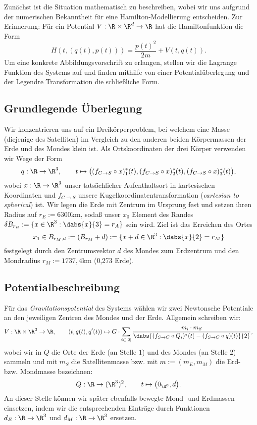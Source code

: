 \documentclass{subfiles}
\begin{document}
    

    Zunächst ist die Situation mathematisch zu beschreiben, wobei wir uns aufgrund der numerischen Bekanntheit für eine Hamilton-Modellierung entscheiden. Zur Erinnerung: Für ein Potential $V:\R\times\R^d\to\R$ hat die Hamiltonfunktion die Form 
    \[
        H(t,(q(t),p(t))) = \frac{p(t)^2}{2m} + V(t,q(t)).
    \]
    Um eine konkrete Abbildungsvorschrift zu erlangen, stellen wir die Lagrange Funktion des Systems auf und finden mithilfe von einer Potentialüberlegung und der Legendre Transformation die schließliche Form. 

    \subsection*{Grundlegende Überlegung}
        Wir konzentrieren uns auf ein Dreikörperproblem, bei welchem eine Masse (diejenige des Satelliten) im Vergleich zu den anderen beiden Körpermassen der Erde und des Mondes klein ist. Als Ortskoordinaten der drei Körper verwenden wir Wege der Form 
        \[
            q:\R\to\R^3,\qquad t\mapsto \bigl((f_{C\to S}\circ x)_1^*(t),(f_{C\to S}\circ x)_2^*(t),(f_{C\to S}\circ x)_3^*(t)\bigr),
        \]
        wobei $x:\R\to\R^3$ unser tatsächlicher Aufenthaltsort in kartesischen Koordinaten und $f_{C\to S}$ unsere Kugelkoordinatentransformation (\emph{cartesian to spherical}) ist. Wir legen die Erde mit Zentrum im Ursprung fest und setzen ihren Radius auf $r_E:=6300\si{\kilo\metre}$, sodaß unser $x_0$ Element des Randes $\delta B_{r_E}:=\{x\in\R^3:\dabs{x}{3} = r_A\}$ sein wird. Ziel ist das Erreichen des Ortes
        \[
            x_1\in B_{r_M,d}:=(B_{r_M}+d):=\{x + d\in\R^3:\dabs{x}{2} = r_M\}
        \]
        festgelegt durch den Zentrumsvektor $d$ des Mondes zum Erdzentrum und den Mondradius $r_M:=1 737,4\si{\kilo\metre}$ (0,273 Erde).

    \subsection*{Potentialbeschreibung}
        Für das \emph{Gravitationspotential} des Systems wählen wir zwei Newtonsche Potentiale an den jeweiligen Zentren des Mondes und der Erde. Allgemein schreiben wir:
        \[
            V:\R\times\R^3\to \R,\qquad (t,q(t),q'(t))\mapsto G\cdot\sum_{i\in[2]}\frac{m_i\cdot m_S}{\dabs{(f_{S\to C}\circ Q_i)^*(t) - (f_{S\to C}\circ q)(t)}{2}},
        \]
        wobei wir in $Q$ die Orte der Erde (an Stelle $1$) und des Mondes (an Stelle $2$) sammeln und mit $m_S$ die Satellitenmasse bzw. mit $m:=(m_E,m_M)$ die Erd- bzw. Mondmasse bezeichnen:
        \[
            Q:\R\to(\R^3)^2,\qquad t\mapsto \bigl(0_{\R^3},d\bigr).
        \]
        An dieser Stelle können wir später ebenfalls bewegte Mond- und Erdmassen einsetzen, indem wir die entsprechenden Einträge durch Funktionen $d_E:\R\to\R^3$ und $d_M:\R\to\R^3$ ersetzen.
\end{document}
